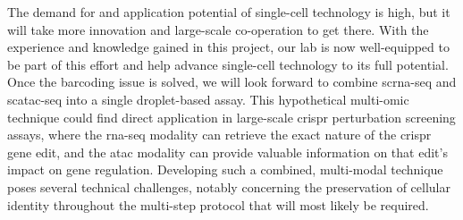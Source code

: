 The demand for and application potential of single-cell technology is high, but it will take more innovation and large-scale co-operation to get there. With the experience and knowledge gained in this project, our lab is now well-equipped to be part of this effort and help advance single-cell technology to its full potential. Once the barcoding issue is solved, we will look forward to combine \acrshort{scrna-seq} and \acrshort{scatac-seq} into a single droplet-based assay. This hypothetical multi-omic technique could find direct application in large-scale \acrshort{crispr} perturbation screening assays, where the \acrshort{rna-seq} modality can retrieve the exact nature of the \acrshort{crispr} gene edit, and the \acrshort{atac} modality can provide valuable information on that edit's impact on gene regulation. Developing such a combined, multi-modal technique poses several technical challenges, notably concerning the preservation of cellular identity throughout the multi-step protocol that will most likely be required.\pms
